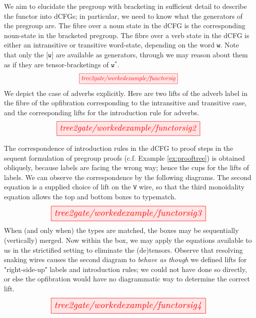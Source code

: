\begin{myboxR}
\begin{construction}\label{cons:pg2cfg} We aim to elucidate the pregroup with bracketing in sufficient detail to describe the functor into dCFGs; in particular, we need to know what the generators of the pregroup are. The fibre over a noun state in the dCFG is the corresponding noun-state in the bracketed pregroup. The fibre over a verb state in the dCFG is either an intransitive or transitive word-state, depending on the word \texttt{w}. Note that only the $\texttt{[w]}$ are available as generators, through we may reason about them as if they are tensor-bracketings of $\texttt{w}^*$.
\[\resizebox{0.45\textwidth}{!}{\tikzfig{tree2gate/workedexample/functorsig}}\]
We depict the case of adverbs explicitly. Here are two lifts of the adverb label in the fibre of the opfibration corresponding to the intransitive and transitive case, and the corresponding lifts for the introduction rule for adverbs.
\[\resizebox{0.65\textwidth}{!}{\tikzfig{tree2gate/workedexample/functorsig2}}\]
\end{construction}
\end{myboxR}

\begin{myboxR}
The correspondence of introduction rules in the dCFG to proof steps in the sequent formulation of pregroup proofs (c.f. Example \ref{ex:prooftree}) is obtained obliquely, because labels are facing the wrong way; hence the cups for the lifts of labels. We can observe the correspondence by the following diagrams. The second equation is a supplied choice of lift on the \texttt{V} wire, so that the third monoidality equation allows the top and bottom boxes to typematch.
\[\resizebox{0.7\textwidth}{!}{\tikzfig{tree2gate/workedexample/functorsig3}}\]
When (and only when) the types are matched, the boxes may be sequentially (vertically) merged. Now within the box, we may apply the equations available to us in the strictified setting to eliminate the (de)tensors. Observe that resolving snaking wires causes the second diagram to \emph{behave as though} we defined lifts for "right-side-up" labels and introduction rules; we could not have done so directly, or else the opfibration would have no diagrammatic way to determine the correct lift.
\[\resizebox{0.7\textwidth}{!}{\tikzfig{tree2gate/workedexample/functorsig4}}\]
\end{myboxR}

